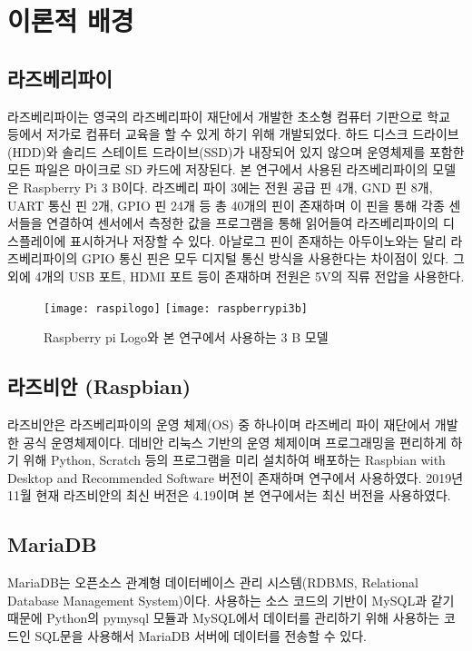 \section{이론적 배경}

\subsection{라즈베리파이}

라즈베리파이는 영국의 라즈베리파이 재단에서 개발한 초소형 컴퓨터 기판으로 학교 등에서 저가로 컴퓨터 교육을 할 수 있게 하기 위해 개발되었다. 하드 디스크 드라이브(HDD)와 솔리드 스테이트 드라이브(SSD)가 내장되어 있지 않으며 운영체제를 포함한 모든 파일은 마이크로 SD 카드에 저장된다. 본 연구에서 사용된 라즈베리파이의 모델은 Raspberry Pi 3 B이다. 라즈베리 파이 3에는 전원 공급 핀 4개, GND 핀 8개, UART 통신 핀 2개, GPIO 핀 24개 등 총 40개의 핀이 존재하며 이 핀을 통해 각종 센서들을 연결하여 센서에서 측정한 값을 프로그램을 통해 읽어들여 라즈베리파이의 디스플레이에 표시하거나 저장할 수 있다. 아날로그 핀이 존재하는 아두이노와는 달리 라즈베리파이의 GPIO 통신 핀은 모두 디지털 통신 방식을 사용한다는 차이점이 있다. 그 외에 4개의 USB 포트, HDMI 포트 등이 존재하며 전원은 5V의 직류 전압을 사용한다.

\begin{figure}[htbp]
	\centering
	\texttt{[image: raspilogo]}
	\texttt{[image: raspberrypi3b]}
	\caption{Raspberry pi Logo와 본 연구에서 사용하는 3 B 모델}
	\label{RASPI}
\end{figure}

\subsection{라즈비안 (Raspbian)}
라즈비안은 라즈베리파이의 운영 체제(OS) 중 하나이며 라즈베리 파이 재단에서 개발한 공식 운영체제이다. 데비안 리눅스 기반의 운영 체제이며 프로그래밍을 편리하게 하기 위해 Python, Scratch 등의 프로그램을 미리 설치하여 배포하는 Raspbian with Desktop and Recommended Software 버전이 존재하며 연구에서 사용하였다. 2019년 11월 현재 라즈비안의 최신 버전은 4.19이며 본 연구에서는 최신 버전을 사용하였다.

\subsection{MariaDB}
MariaDB는 오픈소스 관계형 데이터베이스 관리 시스템(RDBMS, Relational Database Management System)이다. 사용하는 소스 코드의 기반이 MySQL과 같기 때문에 Python의 pymysql 모듈과 MySQL에서 데이터를 관리하기 위해 사용하는 코드인 SQL문을 사용해서 MariaDB 서버에 데이터를 전송할 수 있다.

